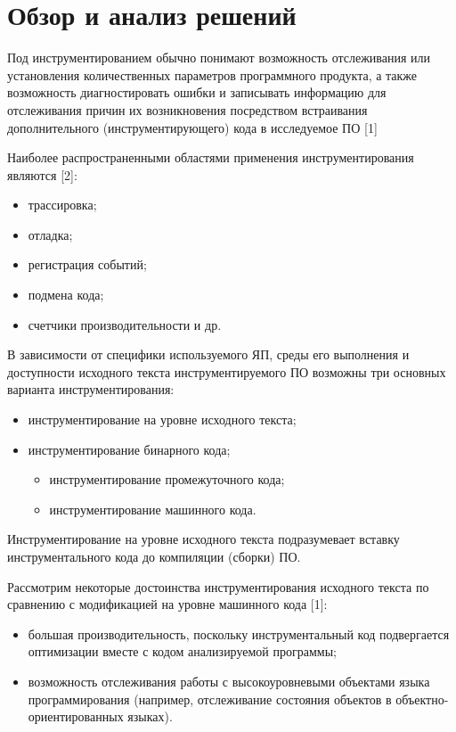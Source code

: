 \chapter{Обзор и анализ решений}

Под инструментированием обычно понимают возможность отслеживания или установления количественных параметров программного продукта, а также возможность диагностировать ошибки и записывать информацию для отслеживания причин их возникновения посредством встраивания дополнительного (инструментирующего) кода в исследуемое ПО [1]

Наиболее распространенными областями применения инструментирования являются [2]:

\begin{itemize}
  \item трассировка;
  \item отладка;
  \item регистрация событий;
  \item подмена кода;
  \item счетчики производительности и др.
\end{itemize}

В зависимости от специфики используемого ЯП, среды его выполнения и доступности исходного текста инструментируемого ПО возможны три основных варианта инструментирования:

\begin{itemize}
  \item инструментирование на уровне исходного текста;
  \item инструментирование бинарного кода;
  \begin{itemize}
    \item инструментирование промежуточного кода;
    \item инструментирование машинного кода.
  \end{itemize}
\end{itemize}

Инструментирование на уровне исходного текста подразумевает вставку инструментального кода до компиляции (сборки) ПО.

Рассмотрим некоторые достоинства инструментирования исходного текста по сравнению с модификацией на уровне машинного кода [1]:
\begin{itemize}
  \item большая производительность, поскольку инструментальный код подвергается оптимизации вместе с кодом анализируемой программы;
  \item возможность отслеживания работы с высокоуровневыми объектами языка программирования (например, отслеживание состояния объектов в объектно-ориентированных языках).
\end{itemize}

